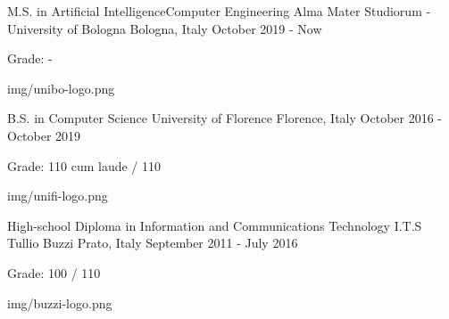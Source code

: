 
\begin{cventries}

  \logocventry
    {M.S. in Artificial Intelligence{\enskip\cdotp\enskip}Computer Engineering}
    {Alma Mater Studiorum - University of Bologna}
    {Bologna, Italy}
    {October 2019 - Now}
    {\begin{cvitems}
      \item {Grade: -}
    \end{cvitems}}
    {img/unibo-logo.png}

  \logocventry
    {B.S. in Computer Science}
    {University of Florence}
    {Florence, Italy}
    {October 2016 - October 2019}
    {
      \begin{cvitems}
        \item {Grade: 110 cum laude / 110}
      \end{cvitems}
    }
    {img/unifi-logo.png}

  \logocventry
    {High-school Diploma in Information and Communications Technology}
    {I.T.S Tullio Buzzi}
    {Prato, Italy}
    {September 2011 - July 2016}
    {
      \begin{cvitems}
        \item {Grade: 100 / 110}
      \end{cvitems}
    }
    {img/buzzi-logo.png}

\end{cventries}

